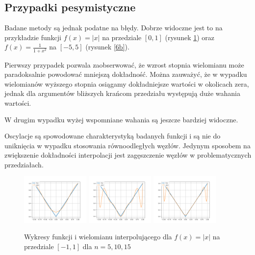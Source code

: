 \documentclass{article}
\begin{document}
\subsection{Przypadki pesymistyczne}

Badane metody są jednak podatne na błędy.
Dobrze widoczne jest to na przykładzie funkcji $f(x)=|x|$ na przedziale $[0,1]$ (rysunek \ref{6a}) oraz $f(x) = \frac{1}{1+x^2}$ na $[-5,5]$ (rysunek \ref{6b}).

Pierwszy przypadek pozwala zaobserwować, że wzrost stopnia wielomianu może paradoksalnie powodować mniejszą dokładność.
Można zauważyć, że w wypadku wielomianów wyższego stopnia osiągamy dokładniejsze wartości w okolicach zera, jednak dla argumentów bliższych krańcom przedziału występują duże wahania wartości.

W drugim wypadku wyżej wspomniane wahania są jeszcze bardziej widoczne.

Oscylacje są spowodowane charakterystyką badanych funkcji i są nie do uniknięcia w wypadku stosowania równoodległych węzłów.
Jedynym sposobem na zwiększenie dokładności interpolacji jest zagęszczenie węzłów w problematycznych przedziałach.


\begin{figure}
\includegraphics[width=0.3\textwidth]{plots/6a_5.png}
\includegraphics[width=0.3\textwidth]{plots/6a_10.png}
\includegraphics[width=0.3\textwidth]{plots/6a_15.png}
\caption{Wykresy funkcji i wielomianu interpolującego dla $f(x) = |x|$ na przedziale $[-1,1]$ dla $n=5,10,15$}
\label{6a}
\end{figure}
\end{document}
